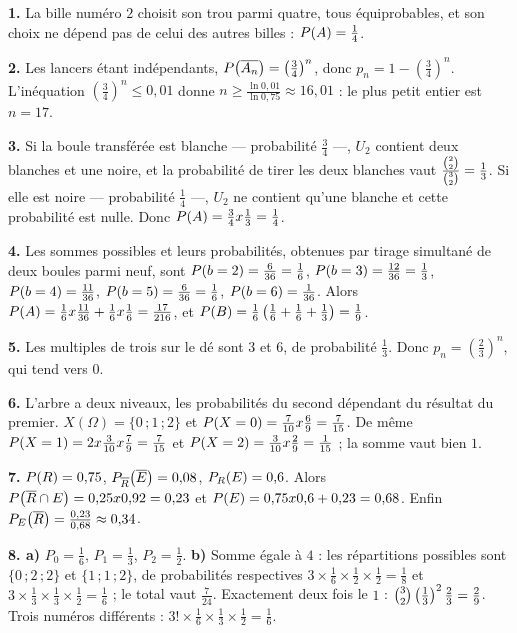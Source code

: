 \begin{corrige}[annales]
\textbf{1.} La bille numéro $2$ choisit son trou parmi quatre, tous
équiprobables, et son choix ne dépend pas de celui des autres billes :
$\proba{A} = \frac14$.

\textbf{2.} Les lancers étant indépendants,
$\proba{\evtc{A_{n}}} = \left(\frac34\right)^{n}$, donc
$p_{n} = 1-\left(\frac34\right)^{n}$. L'inéquation
$\left(\frac34\right)^{n} \leq 0{,}01$ donne
$n \geq \frac{\ln0{,}01}{\ln0{,}75} \approx 16{,}01$ : le plus petit entier
est $n = 17$.

\textbf{3.} Si la boule transférée est blanche — probabilité $\frac34$ —,
$U_{2}$ contient deux blanches et une noire, et la probabilité de tirer les
deux blanches vaut $\frac{\combi{2}{2}}{\combi{2}{3}} = \frac13$. Si elle est
noire — probabilité $\frac14$ —, $U_{2}$ ne contient qu'une blanche et cette
probabilité est nulle. Donc
$\proba{A} = \frac34 \times \frac13 = \frac14$.

\textbf{4.} Les sommes possibles et leurs probabilités, obtenues par tirage
simultané de deux boules parmi neuf, sont
$\proba{b = 2} = \frac{6}{36} = \frac16$,
$\proba{b = 3} = \frac{12}{36} = \frac13$,
$\proba{b = 4} = \frac{11}{36}$,
$\proba{b = 5} = \frac{6}{36} = \frac16$,
$\proba{b = 6} = \frac{1}{36}$. Alors
$\proba{A} = \frac16 \times \frac{11}{36}+\frac16 \times \frac16
= \frac{17}{216}$, et
$\proba{B} = \frac16\left(\frac16+\frac16+\frac13\right) = \frac19$.

\textbf{5.} Les multiples de trois sur le dé sont $3$ et $6$, de probabilité
$\frac13$. Donc $p_{n} = \left(\frac23\right)^{n}$, qui tend vers $0$.

\textbf{6.} L'arbre a deux niveaux, les probabilités du second dépendant du
résultat du premier. $X(\Omega) = \{0\,;1\,;2\}$ et
$\proba{X = 0} = \frac{7}{10} \times \frac69 = \frac{7}{15}$. De même
$\proba{X = 1} = 2 \times \frac{3}{10} \times \frac79 = \frac{7}{15}$ et
$\proba{X = 2} = \frac{3}{10} \times \frac29 = \frac{1}{15}$ ; la somme vaut
bien $1$.

\textbf{7.} $\proba{R} = 0{,}75$, $\probacond{\evtc{E}}{\evtc{R}} = 0{,}08$,
$\probacond{E}{R} = 0{,}6$. Alors
$\proba{\evtc{R} \cap E} = 0{,}25 \times 0{,}92 = 0{,}23$ et
$\proba{E} = 0{,}75 \times 0{,}6+0{,}23 = 0{,}68$. Enfin
$\probacond{\evtc{R}}{E} = \frac{0{,}23}{0{,}68} \approx 0{,}34$.

\textbf{8. a)} $P_{0} = \frac16$, $P_{1} = \frac13$, $P_{2} = \frac12$.
\textbf{b)} Somme égale à $4$ : les répartitions possibles sont
$\{0\,;2\,;2\}$ et $\{1\,;1\,;2\}$, de probabilités respectives
$3 \times \frac16 \times \frac12 \times \frac12 = \frac18$ et
$3 \times \frac13 \times \frac13 \times \frac12 = \frac16$ ; le total vaut
$\frac{7}{24}$. Exactement deux fois le $1$ :
$\combi{2}{3}\left(\frac13\right)^{2}\frac23 = \frac29$. Trois numéros
différents : $3! \times \frac16 \times \frac13 \times \frac12 = \frac16$.


\end{corrige}
